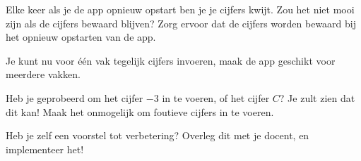\begin{opgave}
    \opgVraag
    Elke keer als je de app opnieuw opstart ben je je cijfers kwijt. Zou het niet mooi zijn als de cijfers bewaard blijven? Zorg ervoor dat de cijfers worden bewaard bij het opnieuw opstarten van de app.
\end{opgave}

\begin{opgave}
    \opgVraag
    Je kunt nu voor \'e\'en vak tegelijk cijfers invoeren, maak de app geschikt voor meerdere vakken.
\end{opgave}

\begin{opgave}
    \opgVraag
    Heb je geprobeerd om het cijfer $-3$ in te voeren, of het cijfer $C$? Je zult zien dat dit kan! Maak het onmogelijk om foutieve cijfers in te voeren.
\end{opgave}

\begin{opgave}
    \opgVraag
    Heb je zelf een voorstel tot verbetering? Overleg dit met je docent, en implementeer het!
\end{opgave}